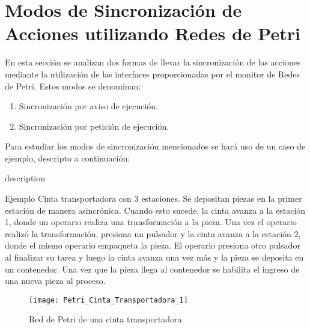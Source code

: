 \section{Modos de Sincronización de Acciones utilizando Redes de Petri}
\label{sec:sincronizacion_cinta_transportadora}
En esta sección se analizan dos formas de llevar la sincronización de las
acciones mediante la utilización de las interfaces proporcionadas por el monitor
de Redes de Petri. Estos modos se denominan:
\begin{enumerate}
  \item Sincronización por aviso de ejecución.
  \item Sincronización por petición de ejecución.
\end{enumerate}

Para estudiar los modos de sincronización mencionados se hará uso de un caso de
ejemplo, descripto a continuación:

\begin{labeling}{description}
\item [Ejemplo]
Cinta transportadora con 3 estaciones. Se depositan piezas en la primer
estación de manera asincrónica. Cuando esto sucede, la cinta avanza a la
estación 1, donde un operario realiza una transformación a la pieza. Una vez el
operario realizó la transformación, presiona un pulsador y la cinta avanza a la
estación 2, donde el mismo operario empaqueta la pieza. El operario
presiona otro pulsador al finalizar su tarea y luego la cinta avanza una vez
más y la pieza se deposita en un contenedor. Una vez que la pieza llega al
contenedor se habilita el ingreso de una nueva pieza al proceso.
\end{labeling}

\begin{figure}[H]
    \centering
    \texttt{[image: Petri\_Cinta\_Transportadora\_1]}
    \caption{Red de Petri de una cinta transportadora}
    \label{fig:petri_cinta_transportadora_1}
\end{figure}


